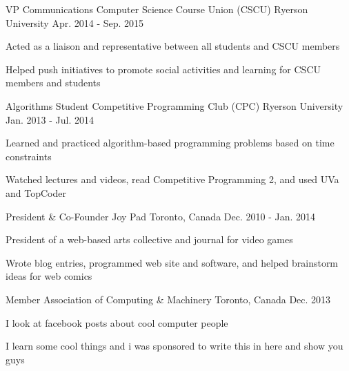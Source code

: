 \begin{cventries}
  \cventry
    {VP Communications}
    {Computer Science Course Union (CSCU)}
    {Ryerson University}
    {Apr. 2014 - Sep. 2015}
    {
      \begin{cvitems}
        \item {Acted as a liaison and representative between all students and CSCU members}
         \item {Helped push initiatives to promote social activities and learning for CSCU members and students}
      \end{cvitems}
      }
   \cventry
    {Algorithms Student}
    {Competitive Programming Club (CPC)}
    {Ryerson University}
    {Jan. 2013 - Jul. 2014}
    {
      \begin{cvitems}
        \item {Learned and practiced algorithm-based programming problems based on time constraints}
        \item {Watched lectures and videos, read Competitive Programming 2, and used UVa and TopCoder}
      \end{cvitems}
    }
   \cventry
    {President \& Co-Founder}
    {Joy Pad}
    {Toronto, Canada}
    {Dec. 2010 - Jan. 2014}
    {
      \begin{cvitems}
        \item {President of a web-based arts collective and journal for video games}
        \item {Wrote blog entries, programmed web site and software, and helped brainstorm ideas for web comics}
      \end{cvitems}
    }
    \cventry
    {Member}
    {Association of Computing \& Machinery}
    {Toronto, Canada}
    {Dec. 2013}
    {
      \begin{cvitems}
        \item {I look at facebook posts about cool computer people}
        \item {I learn some cool things and i was sponsored to write this in here and show you guys}
      \end{cvitems}
    }
\end{cventries}
